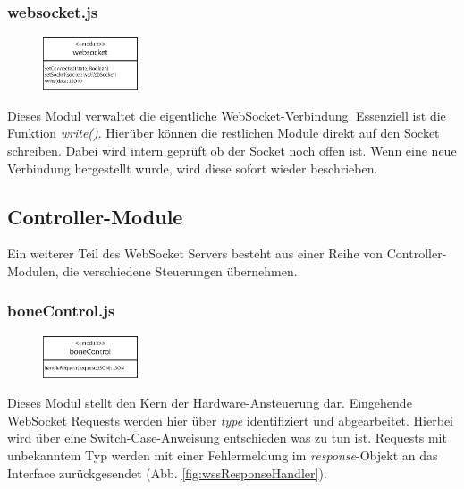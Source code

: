 \subsubsection{websocket.js}
\begin{figure}
  \vspace{-16pt}
  \centering
  \includegraphics[width = 0.25\textwidth]{documentation/images/apiWebsocket.eps}
\end{figure}

Dieses Modul verwaltet die eigentliche WebSocket-Verbindung. Essenziell ist die Funktion \textit{write()}. Hierüber können die restlichen Module direkt auf den Socket schreiben. Dabei wird intern geprüft ob der Socket noch offen ist. Wenn eine neue Verbindung hergestellt wurde, wird diese sofort wieder beschrieben.


\subsection{Controller-Module}
Ein weiterer Teil des WebSocket Servers besteht aus einer Reihe von Controller-Modulen, die verschiedene Steuerungen übernehmen.

\subsubsection{boneControl.js}
\begin{figure}
  \vspace{-16pt}
  \centering
  \includegraphics[width = 0.25\textwidth]{documentation/images/apiBoneControl.eps}
\end{figure}

Dieses Modul stellt den Kern der Hardware-Ansteuerung dar. Eingehende WebSocket Requests werden hier über \textit{type} identifiziert und abgearbeitet. Hierbei wird über eine Switch-Case-Anweisung entschieden was zu tun ist. Requests mit unbekanntem Typ werden mit einer Fehlermeldung im \textit{response}-Objekt an das Interface zurückgesendet (Abb. \ref{fig:wssResponseHandler}).

